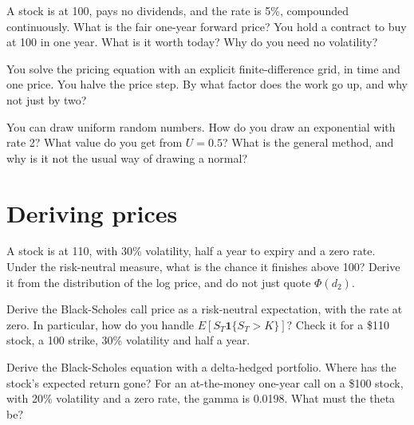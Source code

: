 \begin{question}\label{iq:iv2:pricing-and-numerics:11}
A stock is at 100, pays no dividends, and the rate is 5\%, compounded continuously. What is the fair one-year forward price? You hold a contract to buy at 100 in one year. What is it worth today? Why do you need no volatility?
\end{question}

\begin{question}\label{iq:iv2:pricing-and-numerics:12}
You solve the pricing equation with an explicit finite-difference grid, in time and one price. You halve the price step. By what factor does the work go up, and why not just by two?
\end{question}

\begin{question}\label{iq:iv2:pricing-and-numerics:13}
You can draw uniform random numbers. How do you draw an exponential with rate 2? What value do you get from $U = 0.5$? What is the general method, and why is it not the usual way of drawing a normal?
\end{question}

\section{Deriving prices}

\begin{question}\label{iq:iv2:pricing-and-numerics:14}
A stock is at 110, with 30\% volatility, half a year to expiry and a zero rate. Under the risk-neutral measure, what is the chance it finishes above 100? Derive it from the distribution of the log price, and do not just quote $\Phi(d_2)$.
\end{question}

\begin{question}\label{iq:iv2:pricing-and-numerics:15}
Derive the Black-Scholes call price as a risk-neutral expectation, with the rate at zero. In particular, how do you handle $E[S_T \mathbf{1}\{S_T > K\}]$? Check it for a \$110 stock, a 100 strike, 30\% volatility and half a year.
\end{question}

\begin{question}\label{iq:iv2:pricing-and-numerics:16}
Derive the Black-Scholes equation with a delta-hedged portfolio. Where has the stock's expected return gone? For an at-the-money one-year call on a \$100 stock, with 20\% volatility and a zero rate, the gamma is 0.0198. What must the theta be?
\end{question}

